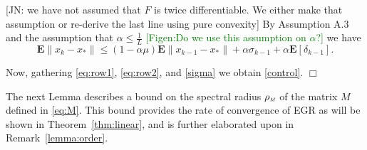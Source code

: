 \documentclass[11pt]{article}
\newtheorem{lem}[thm]{Lemma}
\newcommand{\E}{\mathbf{E}}
\newcommand{\rhom}{\mbox{$\rho_{\mbox{{\it \tiny M}}}$}}
\begin{document}
 {\color{red} [JN: we have not assumed that $F$ is twice differentiable. We either make that assumption or re-derive the last line using pure convexity]}
By Assumption A.3  and the assumption that $\alpha \leq \frac{1}{L}$ \textcolor{green}{[Figen:Do we use this assumption on $\alpha$?]} we have
\begin{equation}\label{eq:row2}
 \E\|x_k-x_\ast\| \leq (1-\alpha\mu)\E\|x_{k-1}-x_\ast\|+ \alpha\sigma_{k-1} + \alpha \E[\delta_{k-1}].
\end{equation}

\noindent
Now, gathering \eqref{eq:row1}, \eqref{eq:row2}, and \eqref{sigma} we obtain \eqref{control}. 
\hspace*{\fill}$\Box$\bigskip



The next Lemma describes a bound on the {\color{blue} spectral radius $\rhom$ }of the matrix $M$ defined in \eqref{eq:M}. This bound provides the rate of convergence of EGR as will be shown in Theorem~\ref{thm:linear}, and is further elaborated upon in Remark~\ref{lemma:order}.
%
%
\end{document}
